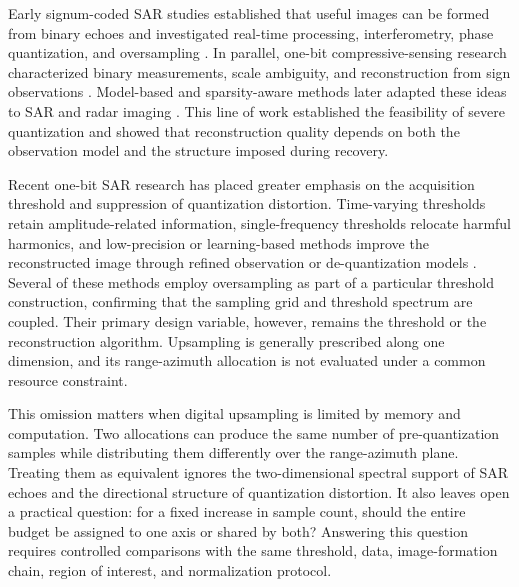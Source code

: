 \documentclass[conference]{IEEEtran}
\begin{document}
Early signum-coded SAR studies established that useful images can be formed from binary echoes and investigated real-time processing, interferometry, phase quantization, and oversampling \cite{franceschetti1991signum,alberti1991time,cappuccino1996processor,fornaro1997interferometry,pascazio1998onebit,franceschetti1999phase}. In parallel, one-bit compressive-sensing research characterized binary measurements, scale ambiguity, and reconstruction from sign observations \cite{candes2008intro,boufounos2008onebit,laska2011trust,jacques2013robust}. Model-based and sparsity-aware methods later adapted these ideas to SAR and radar imaging \cite{dong2015map,wang2019enhanced,ge2023sparse}. This line of work established the feasibility of severe quantization and showed that reconstruction quality depends on both the observation model and the structure imposed during recovery.

Recent one-bit SAR research has placed greater emphasis on the acquisition threshold and suppression of quantization distortion. Time-varying thresholds retain amplitude-related information, single-frequency thresholds relocate harmful harmonics, and low-precision or learning-based methods improve the reconstructed image through refined observation or de-quantization models \cite{demir2018onebit,zhao2019onebit,zhao2021lowprecision,liu2023twobit,si2023dequantization,nie2025fixed}. Several of these methods employ oversampling as part of a particular threshold construction, confirming that the sampling grid and threshold spectrum are coupled. Their primary design variable, however, remains the threshold or the reconstruction algorithm. Upsampling is generally prescribed along one dimension, and its range-azimuth allocation is not evaluated under a common resource constraint.

This omission matters when digital upsampling is limited by memory and computation. Two allocations can produce the same number of pre-quantization samples while distributing them differently over the range-azimuth plane. Treating them as equivalent ignores the two-dimensional spectral support of SAR echoes and the directional structure of quantization distortion. It also leaves open a practical question: for a fixed increase in sample count, should the entire budget be assigned to one axis or shared by both? Answering this question requires controlled comparisons with the same threshold, data, image-formation chain, region of interest, and normalization protocol.
\end{document}
